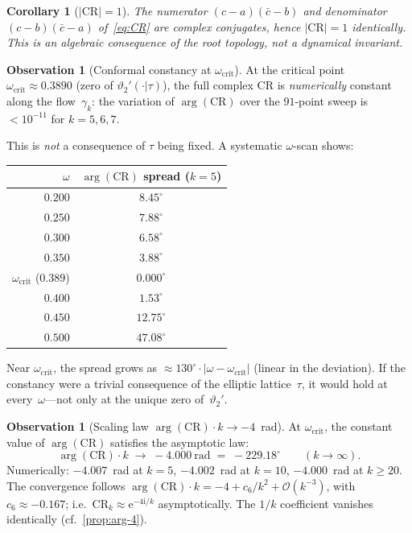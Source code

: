 \documentclass[11pt,a4paper]{article}
\theoremstyle{plain}
\newtheorem{corollary}[theorem]{Corollary}
\theoremstyle{definition}
\newtheorem{observation}[theorem]{Observation}
\theoremstyle{remark}
\newcommand{\vt}[1]{\vartheta_{#1}}     %
\newcommand{\ee}{\mathrm{e}}
\newcommand{\ii}{\mathrm{i}}
\newcommand{\abs}[1]{\lvert #1 \rvert}
\newcommand{\Oo}{\mathcal{O}}
\begin{document}
\begin{corollary}[$\abs{\mathrm{CR}} = 1$]
\label{cor:CR-unit}
The numerator $(c - a)(\bar c - b)$ and denominator
$(c - b)(\bar c - a)$ of~\eqref{eq:CR} are complex conjugates,
hence $\abs{\mathrm{CR}} = 1$ identically.  This is an algebraic
consequence of the root topology, not a dynamical invariant.
\end{corollary}

\begin{observation}[Conformal constancy at $\omega_{\mathrm{crit}}$]
\label{obs:CR-const}
At the critical point $\omega_{\mathrm{crit}} \approx 0.3890$
(zero of $\vt{2}'(\cdot|\tau)$), the full complex $\mathrm{CR}$
is \emph{numerically} constant along the flow~$\gamma_k$: the
variation of $\arg(\mathrm{CR})$ over the $91$-point sweep
is $< 10^{-11}$ for $k = 5, 6, 7$.

This is \emph{not} a consequence of $\tau$ being fixed.
A systematic $\omega$-scan shows:
\begin{center}
\begin{tabular}{@{}rc@{}}
\toprule
$\omega$ & $\arg(\mathrm{CR})$ spread ($k=5$) \\
\midrule
$0.200$ & $8.45^\circ$ \\
$0.250$ & $7.88^\circ$ \\
$0.300$ & $6.58^\circ$ \\
$0.350$ & $3.88^\circ$ \\
$\omega_{\mathrm{crit}}$ ($0.389$) & $\mathbf{0.000}^\circ$ \\
$0.400$ & $1.53^\circ$ \\
$0.450$ & $12.75^\circ$ \\
$0.500$ & $47.08^\circ$ \\
\bottomrule
\end{tabular}
\end{center}
Near $\omega_{\mathrm{crit}}$, the spread grows as
$\approx 130^\circ \cdot \abs{\omega - \omega_{\mathrm{crit}}}$
(linear in the deviation).  If the constancy were a trivial
consequence of the elliptic lattice~$\tau$, it would hold at
every~$\omega$---not only at the unique zero of~$\vt{2}'$.
\end{observation}

\begin{observation}[Scaling law $\arg(\mathrm{CR}) \cdot k \to -4$~rad]
\label{obs:arg-scaling}
At $\omega_{\mathrm{crit}}$, the constant value of
$\arg(\mathrm{CR})$ satisfies the asymptotic law:
\begin{equation}
  \arg(\mathrm{CR}) \cdot k \;\longrightarrow\;
  -4.000~\text{rad} \;=\; -229.18^\circ
  \qquad (k \to \infty).
  \label{eq:arg-4}
\end{equation}
Numerically: $-4.007$~rad at $k=5$, $-4.002$~rad at $k=10$,
$-4.000$~rad at $k \geq 20$.  The convergence follows
$\arg(\mathrm{CR})\cdot k = -4 + c_6/k^2 + \Oo(k^{-3})$,
with $c_6 \approx -0.167$;
i.e.\ $\mathrm{CR}_k \approx \ee^{-4\ii/k}$ asymptotically.
The $1/k$ coefficient vanishes identically (cf.\ \cref{prop:arg-4}).
\end{observation}
\end{document}
